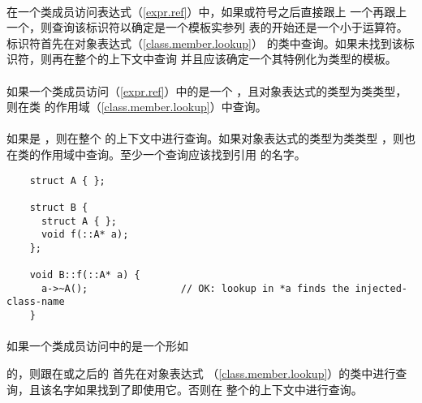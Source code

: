 \paragraph{} %
在一个类成员访问表达式（\ref{expr.ref}）中，如果或\tm{->}符号之后直接跟上
一个再跟上一个\tm{<}，则查询该标识符以确定\tm{<}是一个模板实参列
表的开始还是一个小于运算符。标识符首先在对象表达式（\ref{class.member.lookup}）
的类中查询。如果未找到该标识符，则再在整个的上下文中查询
并且应该确定一个其特例化为类型的模板。

\paragraph{} %
如果一个类成员访问（\ref{expr.ref}）中的是一个
，且对象表达式的类型为类类型，则在类
的作用域（\ref{class.member.lookup}）中查询。

\paragraph{} %
如果是\tm{\tat} ，则在整个
的上下文中进行查询。如果对象表达式的类型为类类型
，则也在类的作用域中查询。至少一个查询应该找到引用
 的名字。

\begin{example}
  \begin{lstlisting}
    struct A { };

    struct B {
      struct A { };
      void f(::A* a);
    };

    void B::f(::A* a) {
      a->~A();                // OK: lookup in *a finds the injected-class-name
    }
  \end{lstlisting}
\end{example}

\paragraph{} %
如果一个类成员访问中的是一个形如\par
\qquad{} \par
的，则跟在或\tm{->}之后的
首先在对象表达式
（\ref{class.member.lookup}）的类中进行查询，且该名字如果找到了即使用它。否则在
整个的上下文中进行查询。

